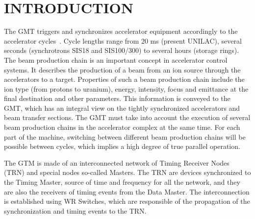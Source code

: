 \section{INTRODUCTION}

The GMT triggers and synchronizes accelerator equipment accordingly 
to the accelerator cycles~\cite{fair_rep}. Cycle lengths range 
from 20 ms (present UNILAC), several seconds (synchrotrons SIS18 
and SIS100/300) to several hours (storage rings). The beam production chain is an important concept in
accelerator control systems. It describes the production of a beam
from an ion source through the accelerators to a target. Properties of such a beam production 
chain include the ion type (from protons to uranium), energy, intensity, focus
and emittance at the final destination and other parameters. This information is
conveyed to the GMT, which 
has an integral view on the tightly synchronized accelerators and beam transfer
sections. The GMT must take into account the execution of several beam production 
chains in the accelerator complex at the same time. For each part of the machine, switching 
between different beam production chains will be possible between cycles, which implies a 
high degree of true parallel operation.

The GTM is made of an interconnected network of Timing Receiver Nodes (TRN) and
special nodes so-called Masters. The TRN are devices synchronized to the Timing
Master, source of time and frequency for all the network, and they are also the
receivers of timing events from the Data Master. The interconnection is
established using WR Switches, which are responsible of the propagation of the
synchronization and timing events to the TRN.

